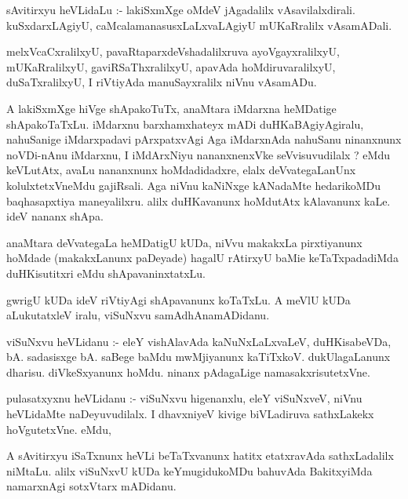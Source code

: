 \documentclass{article}
\begin{document}
\begin{mn}
sAvitirxyu  heVLidaLu :- lakiSxmXge  oMdeV  jAgadalilx vAsavilalxdirali.  kuSxdarxLAgiyU,  
caMcalamanasusxLaLxvaLAgiyU  mUKaRralilx vAsamADali.
\end{mn}

\begin{mn}
melxVcaCxralilxyU,  pavaRtaparxdeVshadalilxruva  ayoVgayxralilxyU,  mUKaRralilxyU, gaviRSaThxralilxyU,  
apavAda  hoMdiruvaralilxyU,  duSaTxralilxyU, I riVtiyAda  manuSayxralilx  niVnu  vAsamADu.
\end{mn}

\begin{mn}
A lakiSxmXge  hiVge  shApakoTuTx, anaMtara iMdarxna heMDatige  shApakoTaTxLu.  
iMdarxnu barxhamxhateyx mADi duHKaBAgiyAgiralu, nahuSanige  iMdarxpadavi 
pArxpatxvAgi  Aga iMdarxnAda nahuSanu  ninanxnunx  noVDi-nAnu  iMdarxnu, 
I iMdArxNiyu  nananxnenxVke  seVvisuvudilalx ?  eMdu keVLutAtx,  avaLu  
nananxnunx  hoMdadidadxre, elalx  deVvategaLanUnx kolulxtetxVneMdu  
gajiRsali.  Aga niVnu kaNiNxge kANadaMte  hedarikoMDu  baqhasapxtiya  
maneyalilxru.  alilx  duHKavanunx  hoMdutAtx  kAlavanunx kaLe.  ideV nananx shApa. 
\end{mn}

\begin{mn}
anaMtara deVvategaLa  heMDatigU  kUDa, niVvu  makakxLa pirxtiyanunx  hoMdade (makakxLanunx paDeyade) 
hagalU rAtirxyU  baMie  keTaTxpadadiMda duHKisutitxri eMdu shApavaninxtatxLu.
\end{mn}

\begin{mn}
gwrigU kUDa ideV riVtiyAgi  shApavanunx  koTaTxLu. A meVlU  kUDa  aLukutatxleV iralu, viSuNxvu samAdhAnamADidanu.
\end{mn}

\begin{mn}
viSuNxvu heVLidanu :- eleY  vishAlavAda kaNuNxLaLxvaLeV, duHKisabeVDa, bA. 
sadasisxge bA.  saBege baMdu mwMjiyanunx kaTiTxkoV.  dukUlagaLanunx dharisu.  
diVkeSxyanunx hoMdu.  ninanx pAdagaLige namasakxrisutetxVne.
\end{mn}

\begin{mn}
pulasatxyxnu  heVLidanu :- viSuNxvu higenanxlu, eleY viSuNxveV, niVnu heVLidaMte naDeyuvudilalx.
  I dhavxniyeV kivige biVLadiruva sathxLakekx hoVgutetxVne. eMdu,
\end{mn}

\begin{mn}
A sAvitirxyu  iSaTxnunx  heVLi  beTaTxvanunx  hatitx  etatxravAda sathxLadalilx niMtaLu.  
alilx  viSuNxvU  kUDa  keYmugidukoMDu  bahuvAda BakitxyiMda  namarxnAgi  sotxVtarx mADidanu.
\end{mn}
\end{document}
